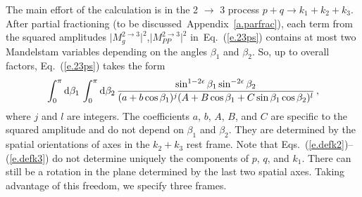 \documentclass[prd,preprintnumbers,nofootinbib,superscriptaddress,onecolumn,preprint]{revtex4-1}
\newcommand\3[1]{\boldsymbol{#1}}
\newcommand{\eref}[1]{Eq.~(\ref{e.#1})}
\newcommand{\erefs}[2]{Eqs.~(\ref{e.#1})--(\ref{e.#2})}
\newcommand{\aref}[1]{Appendix~\ref{a.#1}}
\begin{document}
The main effort of the calculation is in the 2 $\rightarrow$ 3 process
$p+q \rightarrow k_1+k_2+k_3$.  After partial fractioning (to be
discussed~\aref{parfrac}), each term from the squared amplitudes
$\lvert M^{2\to 3}_g \rvert^2$,$\lvert M^{2\to 3}_{PP}\rvert^2$
in~\eref{23ps} contains at most two Mandelstam variables depending on
the angles $\beta_1$ and $\beta_2$.  So, up to overall factors,
\eref{23ps} takes the form
%
\begin{align}
\int_0^{\pi} \diff{\beta_1}{} \int_0^{\pi} \diff{\beta_2}{} 
\frac{\sin^{1-2\epsilon}\beta_1\sin^{-2\epsilon}\beta_2}
{(a+b\cos\beta_1)^j(A+B\cos\beta_1+C\sin\beta_1\cos\beta_2)^l} \, ,
\label{e.int_gen}
\end{align}
%
where $j$ and $l$ are integers. The coefficients $a$, $b$, $A$, $B$,
and $C$ are specific to the squared amplitude and do not depend on
$\beta_1$ and $\beta_2$. They are determined by the spatial
orientations of axes in the $k_2+k_3$ rest frame. Note that
\erefs{defk2}{defk3} do not determine uniquely the components of $p$,
$q$, and $k_1$. There can still be a rotation in the plane determined
by the last two spatial axes. Taking advantage of this freedom, we
specify three frames.
%
\end{document}
